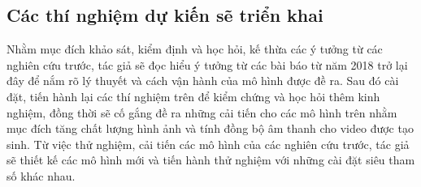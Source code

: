\subsection{\texorpdfstring{Các thí nghiệm dự kiến sẽ triển khai}{Empty}}

Nhằm mục đích khảo sát, kiểm định và học hỏi, kế thừa các ý tưởng từ các nghiên cứu trước, tác giả sẽ đọc hiểu ý tưởng từ các bài báo từ năm 2018 trở lại đây để nắm rõ lý thuyết và cách vận hành của mô hình được đề ra. Sau đó cài đặt, tiến hành lại các thí nghiệm trên để kiểm chứng và học hỏi thêm kinh nghiệm, đồng thời sẽ cố gắng đề ra những cải tiến cho các mô hình trên nhằm mục đích tăng chất lượng hình ảnh và tính đồng bộ âm thanh cho video được tạo sinh. Từ việc thử nghiệm, cải tiến các mô hình của các nghiên cứu trước, tác giả sẽ thiết kế các mô hình mới và tiến hành thử nghiệm với những cài đặt siêu tham số khác nhau.

